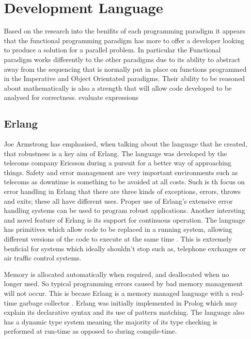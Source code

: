 \documentclass[main.tex]{subfiles}
\begin{document}
\section{Development Language} %

Based on the research into the benifits of each programming paradigm it appears that the functional programming paradigm has more to offer a developer looking to produce a solution for a parallel problem. In particular the Functional paradigm works differently to the other paradigms due to its ability to abstract away from the sequencing that is normally put in place on functions programmed in the Imperative and Object Orientated paradigms. Their ability to be reasoned about mathematically is also a strength that will allow code developed to be analysed for correctness. evaluate expressions

\subsection{Erlang}

Joe Armstrong\cite{Armstrong2009} has emphasised, when talking about the language that he created, that robustness is a key aim of Erlang. The language was developed by the telecoms company Ericsson during a pursuit for a better way of approaching things. Safety and error management are very important environments such as telecoms as downtime is something to be avoided at all costs. Such is th focus on error handling in Erlang that there are three kinds of exceptions, errors, throws and exits; these all have different uses\cite{Trottier-Hebert2011}. Proper use of Erlang's extensive error handling systems can be used to program robust applications. Another intersting and novel feature of Erlang is its support for continuous operation. The language has primitives which allow code to be replaced in a running system, allowing different versions of the code to execute at the same time \cite{Armstrong1995}. This is extremely benficial for systems which ideally shouldn't stop such as, telephone exchanges or air traffic control systems. %

Memory is allocated automatically when required, and deallocated when no longer used. So typical programming errors caused by bad memory management will not occur. This is becase Erlang is a memory managed language with a real-time garbage collector \cite{Armstrong1995}. Erlang was initially implemented in Prolog which may explain its declarative syntax and its use of pattern matching\cite{Armstrong2009}. The language also has a dynamic type system meaning the majority of its type checking is performed at run-time as opposed to during compile-time.
\end{document}
